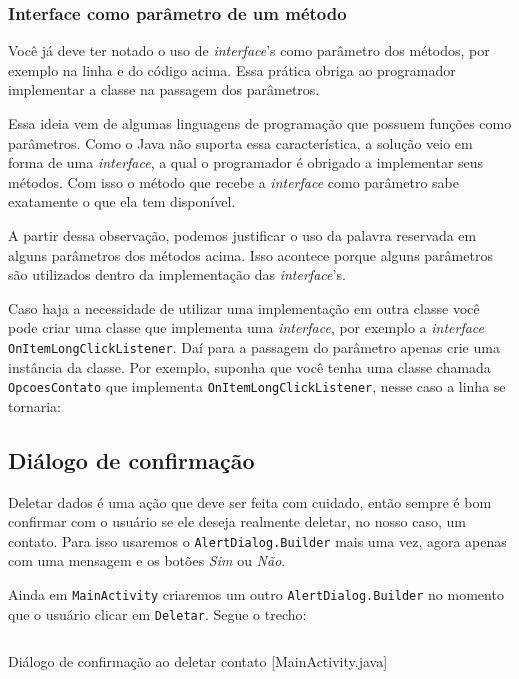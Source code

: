 \subsubsection{Interface como parâmetro de um método}

Você já deve ter notado o uso de \textit{interface}'s como parâmetro dos métodos, por exemplo
na linha  e  do código acima. Essa prática obriga ao programador implementar
a classe na passagem dos parâmetros.

Essa ideia vem de algumas linguagens de programação que possuem funções como parâmetros. Como o Java
não suporta essa característica, a solução veio em forma de uma \textit{interface}, a qual o programador
é obrigado a implementar seus métodos. Com isso o método que recebe a \textit{interface} como parâmetro
sabe exatamente o que ela tem disponível.

A partir dessa observação, podemos justificar o uso da palavra reservada  em alguns
parâmetros dos métodos acima. Isso acontece porque alguns parâmetros são utilizados dentro da implementação
das \textit{interface}'s.

Caso haja a necessidade de utilizar uma implementação em outra classe você pode criar uma classe que
implementa uma \textit{interface}, por exemplo a \textit{interface} \texttt{OnItemLongClickListener}.
Daí para a passagem do parâmetro apenas crie uma instância da classe. Por exemplo, suponha que você
tenha uma classe chamada \texttt{OpcoesContato} que implementa \texttt{OnItemLongClickListener}, nesse
caso a linha  se tornaria:


\subsection{Diálogo de confirmação}

Deletar dados é uma ação que deve ser feita com cuidado, então sempre é bom confirmar com
o usuário se ele deseja realmente deletar, no nosso caso, um contato. Para isso usaremos o
\texttt{AlertDialog.Builder} mais uma vez, agora apenas com uma mensagem e os botões
\textit{Sim} ou \textit{Não}.


Ainda em \texttt{MainActivity} criaremos um outro \texttt{AlertDialog.Builder} no momento que o usuário
clicar em \texttt{Deletar}. Segue o trecho:

\begin{listing}[H]
  \inputminted[linenos=true,frame=bottomline,tabsize=3]{ java }{ source/MainActivity-9.java }
  \caption{Diálogo de confirmação ao deletar contato [MainActivity.java]}
\end{listing}

